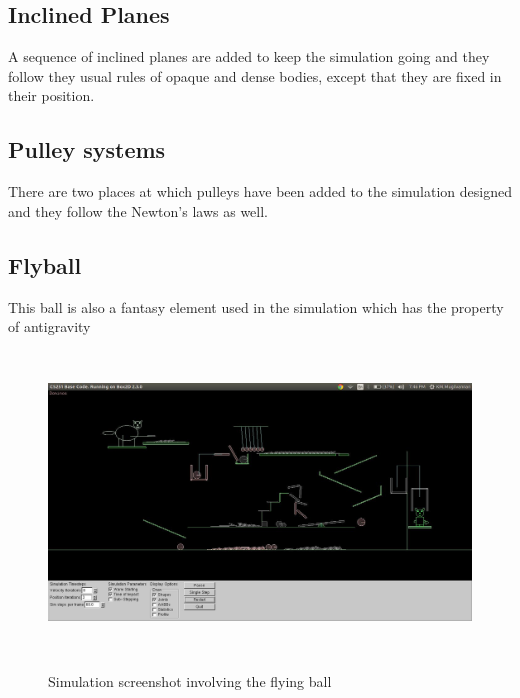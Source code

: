 \documentclass{article}
\begin{document}
    \subsection{Inclined Planes}
        A sequence of inclined planes are added to keep the simulation going and they follow they usual rules of opaque and dense bodies, except that they are fixed in their position.
    \subsection{Pulley systems}
        There are two places at which pulleys have been added to the simulation designed and they follow the Newton's laws \cite{newton} as well.    
    \subsection{Flyball}
        This ball is also a fantasy element used in the simulation which has the property of antigravity \cite{newton} 
    \begin{figure}[h] 
    \caption{Simulation screenshot involving the flying ball}
    \begin{center}
    \includegraphics[height=8cm,scale=0.30]{Flyball}
    \label{Flying Ball}
    \end{center}
    \end{figure} 
\end{document}
